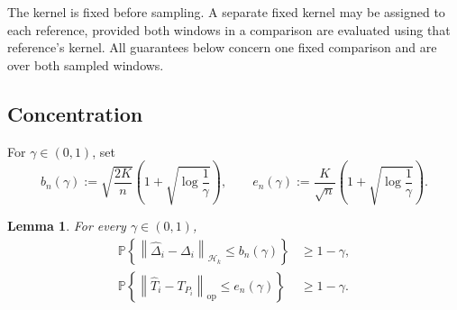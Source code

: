 \documentclass[11pt,a4paper]{article}
\newtheorem{lemma}{Lemma}
\newcommand{\HH}{\mathcal H_k}
\newcommand{\Prob}{\mathbb P}
\newcommand{\norm}[1]{\left\lVert #1\right\rVert}
\newcommand{\op}{\mathrm{op}}
\begin{document}
The kernel is fixed before sampling. A separate fixed
kernel may be assigned to each reference, provided
both windows in a comparison are evaluated using
that reference's kernel. All guarantees below concern
one fixed comparison and are over both sampled windows.

\subsection{Concentration}

For $\gamma\in(0,1)$, set
\begin{equation}\label{eq:radii}
    b_n(\gamma)
    :=
    \sqrt{\frac{2K}{n}}
    \left(1+\sqrt{\log\frac1\gamma}\right),
    \qquad
    e_n(\gamma)
    :=
    \frac K{\sqrt n}
    \left(1+\sqrt{\log\frac1\gamma}\right).
\end{equation}

\begin{lemma}\label{lem:concentration}
For every $\gamma\in(0,1)$,
\begin{align}
    \Prob\left\{
        \norm{\widehat\Delta_i-\Delta_i}_{\HH}
        \le b_n(\gamma)
    \right\}
    &\ge1-\gamma,
    \label{eq:mean-concentration}\\
    \Prob\left\{
        \norm{\widehat T_i-T_{P_i}}_{\op}
        \le e_n(\gamma)
    \right\}
    &\ge1-\gamma.
    \label{eq:operator-concentration}
\end{align}
\end{lemma}
\end{document}
